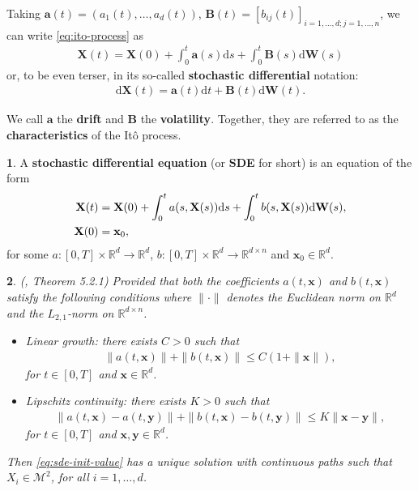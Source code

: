 \documentclass[english]{article}
\numberwithin{equation}{section}
\numberwithin{figure}{section}
\theoremstyle{bolddescit}
\newtheorem{theorem}{\protect\theoremname}[section]
\theoremstyle{definition}
\newtheorem{definition}[theorem]{\protect\definitionname}
\theoremstyle{definition}
\theoremstyle{plain}
\theoremstyle{plain}
\theoremstyle{bolddesc}
\theoremstyle{plain}
\theoremstyle{remark}
\providecommand{\definitionname}{Definition}
\providecommand{\theoremname}{Theorem}
\begin{document}
Taking $\mathbf{a}(t) = (a_1(t),\ldots,a_d(t))$, $\mathbf{B}(t) = [b_{ij}(t)]_{i=1,\ldots,d;j=1,\ldots,n}$, we can write \eqref{eq:ito-process} as
\begin{align*}
  \mathbf{X}(t) = \mathbf{X}(0) + \int_0^t \mathbf{a}(s) \mathrm{d}s + \int_0^t \mathbf{B}(s) \mathrm{d}\mathbf{W}(s)
\end{align*}
or, to be even terser, in its so-called \textbf{stochastic differential} notation:
\begin{align*}
  \mathrm{d}\mathbf{X}(t) = \mathbf{a}(t) \mathrm{d}t + \mathbf{B}(t) \mathrm{d}\mathbf{W}(t).
\end{align*}

We call $\mathbf{a}$ the \textbf{drift} and $\mathbf{B}$ the \textbf{volatility}. Together, they are referred to as the \textbf{characteristics} of the It\^o process.

\begin{definition}
  A \textbf{stochastic differential equation} (or \textbf{SDE} for short) is an equation of the form
  \begin{align}\label{eq:sde-init-value}
    \mathbf{X}(t) &= \mathbf{X}(0) + \int_0^t a(s, \mathbf{X}(s)) \mathrm{d}s + \int_0^t b(s, \mathbf{X}(s)) \mathrm{d}\mathbf{W}(s),\\
    \mathbf{X}(0) &= \mathbf{x}_0,\notag
  \end{align}
  for some $a : [0,T] \times \mathbb{R}^{d} \to \mathbb{R}^d$, $b : [0,T] \times \mathbb{R}^{d} \to \mathbb{R}^{d \times n}$ and $\mathbf{x}_0 \in \mathbb{R}^d$.
\end{definition}

\begin{theorem}\label{thm:sde-solution}
  (\cite{oksendal_stochastic_2003}, Theorem 5.2.1)
  Provided that both the coefficients $a(t,\mathbf{x})$ and $b(t,\mathbf{x})$ satisfy the following conditions where $\|\cdot\|$ denotes the Euclidean norm on $\mathbb{R}^d$ and the $L_{2,1}$-norm on $\mathbb{R}^{d \times n}$.
  \begin{itemize}
    \item Linear growth: there exists $C > 0$ such that
      \begin{align*}
        \|a(t,\mathbf{x})\| + \|b(t,\mathbf{x})\| \le C (1 + \|\mathbf{x}\|),
      \end{align*}
      for $t \in [0,T]$ and $\mathbf{x} \in \mathbb{R}^d$.

    \item Lipschitz continuity: there exists $K > 0$ such that
      \begin{align*}
        \|a(t,\mathbf{x}) - a(t,\mathbf{y})\| + \|b(t,\mathbf{x}) - b(t,\mathbf{y})\| \le K \|\mathbf{x}-\mathbf{y}\|,
      \end{align*}
      for $t \in [0,T]$ and $\mathbf{x},\mathbf{y} \in \mathbb{R}^d$.
  \end{itemize}
  Then \eqref{eq:sde-init-value} has a unique solution with continuous paths such that $X_i \in \mathcal{M}^2$, for all $i=1,\ldots,d$.
\end{theorem}
\end{document}
